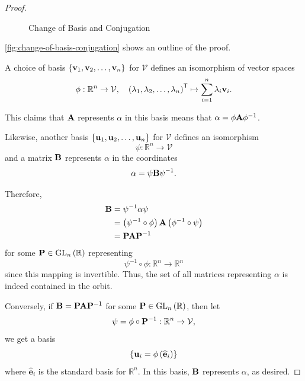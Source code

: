 \documentclass{article}
\theoremstyle{definition}
\theoremstyle{remark}
\newcommand{\pqty}[1]{\left(#1\right)}
\newcommand{\Bqty}[1]{\left\{#1\right\}}
\newcommand{\functiondomain}[3]{#1:#2\to #3}
\newcommand{\function}[5]{#1:#2\to #3,\quad #4\mapsto #5}
\newcommand{\inverse}{^{-1}}
\newcommand{\transpose}{^{\mathsf{T}}}
\newcommand{\isomorphic}{\cong}
\newcommand{\RR}{\mathbb{R}}
\newcommand{\GL}{\operatorname{GL}}
\newcommand{\unitv}[1]{\widehat{\mathbf{#1}}}
\begin{document}
\begin{proof}
    \begin{figure}[ht!]
        \centering
        \caption{Change of Basis and Conjugation}
        \label{fig:change-of-basis-conjugation}
    \end{figure}

    \autoref{fig:change-of-basis-conjugation} shows an outline of the proof.

    A choice of basis \(\Bqty{\vb{v}_1, \vb{v}_2, \ldots, \vb{v}_n}\) for \(\mathcal{V}\) defines an isomorphism of vector spaces
    \[
        \function{\phi}{\RR^n}{\mathcal{V}}{\pqty{\lambda_1, \lambda_2, \ldots, \lambda_n}\transpose}{\sum_{i = 1}^{n} \lambda_i \vb{v}_i}.
    \]

    This claims that \(\vb{A}\) represents \(\alpha\) in this basis means that \(\alpha = \phi \vb{A} \phi\inverse\).

    Likewise, another basis \(\Bqty{\vb{u}_1, \vb{u}_2, \ldots, \vb{u}_n}\) for \(\mathcal{V}\) defines an isomorphism
    \[
        \functiondomain{\psi}{\RR^n}{\mathcal{V}}
    \]
    and a matrix \(\vb{B}\) represents \(\alpha\) in the coordinates
    \[
        \alpha = \psi \vb{B} \psi\inverse.
    \]

    Therefore,
    \begin{align*}
        \vb{B} &= \psi\inverse \alpha \psi \\
        &= \pqty{\psi\inverse \circ \phi} \vb{A} \pqty{\phi\inverse \circ \psi} \\
        &= \vb{P} \vb{A} \vb{P}\inverse
    \end{align*}
    for some \(\vb{P} \in \GL_n\pqty{\RR}\) representing
    \[
        \functiondomain{\psi\inverse \circ \phi}{\RR^n}{\RR^n}
    \]
    since this mapping is invertible. Thus, the set of all matrices representing \(\alpha\) is indeed contained in the orbit.

    Conversely, if \(\vb{B} = \vb{P} \vb{A} \vb{P}\inverse\) for some \(\vb{P} \in \GL_n\pqty{\RR}\), then let
    \[
        \functiondomain{\psi = \phi \circ \vb{P}\inverse}{\RR^n}{\mathcal{V}},
    \]
    we get a basis
    \[
        \Bqty{\vb{u}_i = \phi\pqty{\unitv{e}_i}}
    \]
    where \(\unitv{e}_i\) is the standard basis for \(\RR^n\). In this basis, \(\vb{B}\) represents \(\alpha\), as desired.
\end{proof}
\end{document}
